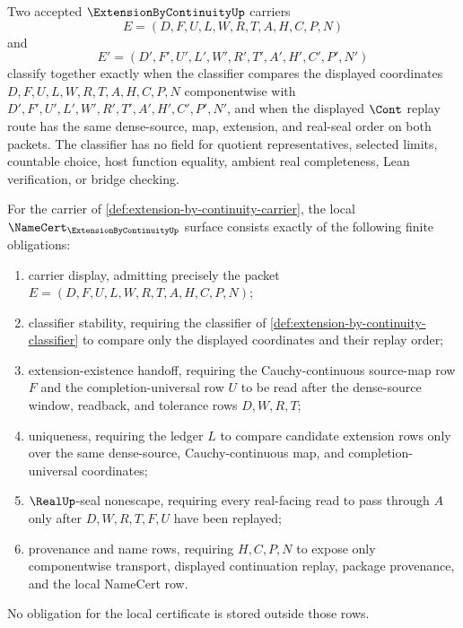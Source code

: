 \begin{definition}
\label{def:extension-by-continuity-classifier}
Two accepted $\ExtensionByContinuityUp$ carriers
$$
E=(D,F,U,L,W,R,T,A,H,C,P,N)
$$
and
$$
E'=(D',F',U',L',W',R',T',A',H',C',P',N')
$$
classify together exactly when the classifier compares the displayed coordinates $D,F,U,L,W,R,T,A,H,C,P,N$ componentwise with $D',F',U',L',W',R',T',A',H',C',P',N'$, and when the displayed $\Cont$ replay route has the same dense-source, map, extension, and real-seal order on both packets. The classifier has no field for quotient representatives, selected limits, countable choice, host function equality, ambient real completeness, Lean verification, or bridge checking.
\end{definition}

\begin{theorem}
\label{thm:extension-by-continuity-namecert-obligations}
For the carrier of \autoref{def:extension-by-continuity-carrier}, the local $\NameCert_{\ExtensionByContinuityUp}$ surface consists exactly of the following finite obligations:
\begin{enumerate}
\item carrier display, admitting precisely the packet $E=(D,F,U,L,W,R,T,A,H,C,P,N)$;
\item classifier stability, requiring the classifier of \autoref{def:extension-by-continuity-classifier} to compare only the displayed coordinates and their replay order;
\item extension-existence handoff, requiring the Cauchy-continuous source-map row $F$ and the completion-universal row $U$ to be read after the dense-source window, readback, and tolerance rows $D,W,R,T$;
\item uniqueness, requiring the ledger $L$ to compare candidate extension rows only over the same dense-source, Cauchy-continuous map, and completion-universal coordinates;
\item $\RealUp$-seal nonescape, requiring every real-facing read to pass through $A$ only after $D,W,R,T,F,U$ have been replayed;
\item provenance and name rows, requiring $H,C,P,N$ to expose only componentwise transport, displayed continuation replay, package provenance, and the local NameCert row.
\end{enumerate}
No obligation for the local certificate is stored outside those rows.
\end{theorem}
